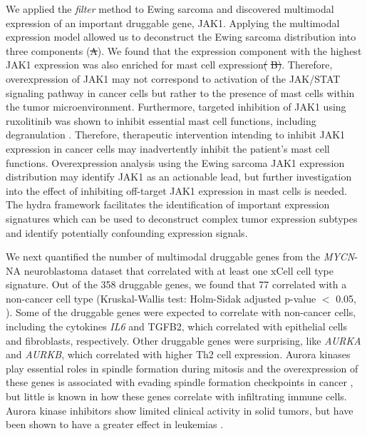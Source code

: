 \documentclass[10pt,letterpaper]{article}
\providecommand{\DIFdeltex}[1]{{\protect\color{red}\sout{#1}}}                      %
\providecommand{\DIFdelbegin}{} %
\providecommand{\DIFdelend}{} %
\providecommand{\DIFdel}[1]{\texorpdfstring{\DIFdeltex{#1}}{}} %
\newcommand{\DIFscaledelfig}{0.5}
\newlength{\DIFdelgraphicswidth} %
\newlength{\DIFdelgraphicsheight} %
\newcommand{\DIFdelincludegraphics}[2][]{%
\sbox{\DIFdelgraphicsbox}{\DIFOincludegraphics[#1]{#2}}%
\settoboxwidth{\DIFdelgraphicswidth}{\DIFdelgraphicsbox} %
\settoboxtotalheight{\DIFdelgraphicsheight}{\DIFdelgraphicsbox} %
\scalebox{\DIFscaledelfig}{%
\parbox[b]{\DIFdelgraphicswidth}{\usebox{\DIFdelgraphicsbox}\\[-\baselineskip] \rule{\DIFdelgraphicswidth}{0em}}\llap{\resizebox{\DIFdelgraphicswidth}{\DIFdelgraphicsheight}{%
\setlength{\unitlength}{\DIFdelgraphicswidth}%
\begin{picture}(1,1)%
\thicklines\linethickness{2pt} %
{\color[rgb]{1,0,0}\put(0,0){\framebox(1,1){}}}%
{\color[rgb]{1,0,0}\put(0,0){\line( 1,1){1}}}%
{\color[rgb]{1,0,0}\put(0,1){\line(1,-1){1}}}%
\end{picture}%
}\hspace*{3pt}}} %
} %
\DeclareRobustCommand{\DIFdelbegin}{\DIFOdelbegin \let\includegraphics\DIFdelincludegraphics} %
\DeclareRobustCommand{\DIFdelend}{\DIFOaddend \let\includegraphics\DIFOincludegraphics} %
\begin{document}
We applied the \textit{filter} method to Ewing sarcoma and discovered multimodal expression of an important druggable gene, JAK1. Applying the multimodal expression model allowed us to deconstruct the Ewing sarcoma distribution into three components (\DIFdelbegin \DIFdel{A}\DIFdelend ). We found that the expression component with the highest JAK1 expression was also enriched for mast cell expression\DIFdelbegin \DIFdel{(}%
\DIFdel{B)}\DIFdelend . Therefore, overexpression of JAK1 may not correspond to activation of the JAK/STAT signaling pathway in cancer cells but rather to the presence of mast cells within the tumor microenvironment. Furthermore, targeted inhibition of JAK1 using ruxolitinib was shown to inhibit essential mast cell functions, including degranulation \cite{hermansJAK1JAK2Inhibitor2018}. Therefore, therapeutic intervention intending to inhibit JAK1 expression in cancer cells may inadvertently inhibit the patient’s mast cell functions. Overexpression analysis using the Ewing sarcoma JAK1 expression distribution may identify JAK1 as an actionable lead, but further investigation into the effect of inhibiting off-target JAK1 expression in mast cells is needed. The hydra framework facilitates the identification of important expression signatures which can be used to deconstruct complex tumor expression subtypes and identify potentially confounding expression signals.

We next quantified the number of multimodal druggable genes from the \textit{MYCN}-NA neuroblastoma dataset that correlated with at least one xCell cell type signature. Out of the 358 druggable genes, we found that 77 correlated with a non-cancer cell type (Kruskal-Wallis test: Holm-Sidak adjusted p-value $<$ 0.05, ). Some of the druggable genes were expected to correlate with non-cancer cells, including the cytokines \textit{IL6} and TGFB2, which correlated with epithelial cells and fibroblasts, respectively. Other druggable genes were surprising, like \textit{AURKA} and \textit{AURKB}, which correlated with higher Th2 cell expression. Aurora kinases play essential roles in spindle formation during mitosis and the overexpression of these genes is associated with evading spindle formation checkpoints in cancer \cite{marisInitialTestingAurora2010}, but little is known in how these genes correlate with infiltrating immune cells. Aurora kinase inhibitors show limited clinical activity in solid tumors, but have been shown to have a greater effect in leukemias \cite{marisInitialTestingAurora2010,gautschiAuroraKinasesAnticancer2008}.
\end{document}
